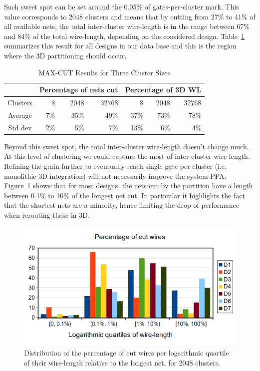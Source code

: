 \documentclass[conference]{IEEEtran}
\begin{document}
Such sweet spot can be set around the 0.05\% of gates-per-cluster mark. This value corresponds to 2048 clusters and means that by cutting from 27\% to 41\% of all available nets, the total inter-cluster wire-length is in the range between 67\% and 84\% of the total wire-length, depending on the considered design. Table~\ref{tab:res} summarizes this result for all designs in our data base and this is the region where the 3D partitioning should occur. 
\begin{table}[!t]
\renewcommand{\arraystretch}{1.25}
\caption{MAX-CUT Results for Three Cluster Sizes}
\label{tab:res}
\centering
\begin{tabular}{|c|r|r|r|r|r|r|}
\cline{2-7}
\multicolumn{1}{c|}{} & \multicolumn{3}{c|}{Percentage of nets cut} & \multicolumn{3}{c|}{Percentage of 3D WL}\\
\hline
\multicolumn{1}{|c|}{Clusters} & 8 & 2048 & 32768 & 8 & 2048 & 32768\\
\hline
Average & 7\% & 35\% & 49\% & 37\% & 73\% & 78\%\\
\hline
Std dev & 2\% & 5\% & 7\% & 13\% & 6\% & 4\%\\
\hline
\end{tabular}
\end{table}
Beyond this sweet spot, the total inter-cluster wire-length doesn't change much. At this level of clustering we could capture the most of inter-cluster wire-length. Refining the grain further to eventually reach single gate per cluster (i.e. monolithic 3D-integration) will not necessarily improve the system PPA.\\
Figure~\ref{fig:dits-wl-quart} shows that for most designs, the nets cut by the partition have a length between 0.1\% to 10\% of the longest net cut. In particular it highlights the fact that the shortest nets are a minority, hence limiting the drop of performance when rerouting those in 3D.
\begin{figure}[!t]
\centering
\includegraphics[width=0.9\linewidth]{netCutWL_maxcut_all_log-quart_2048.png}
\caption{Distribution of the percentage of cut wires per logarithmic quartile of their wire-length relative to the longest net, for 2048 clusters.}
\label{fig:dits-wl-quart}
\end{figure}
\end{document}
